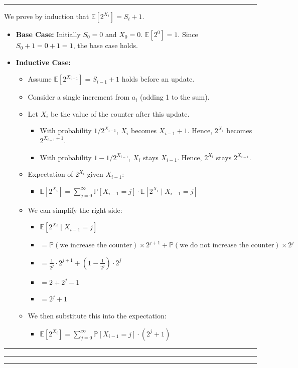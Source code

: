 \documentclass[11pt, english]{article}
\newenvironment{answer}{%
  \par\noindent\hrule %
  \vspace{0.25\baselineskip}%
  \noindent{\Large\bfseries Answer}\par\vspace{0.25\baselineskip}\noindent\ignorespaces
}{%
  \par\vspace{0.5\baselineskip}%
  \noindent\hrule\vspace{0.5\baselineskip}%
  \hrule\hrule
}
\begin{document}
\begin{answer}
We prove by induction that $\mathbb{E}[2^{X_i}] = S_i + 1$.

\begin{itemize}
    \item \textbf{Base Case:} Initially $S_0=0$ and $X_0=0$. $\mathbb{E}[2^0] = 1$. Since $S_0+1 = 0+1=1$, the base case holds.
    \item \textbf{Inductive Case:} 
    \begin{itemize}
        \item Assume $\mathbb{E}[2^{X_{i-1}}] = S_{i-1} + 1$ holds before an update.
        \item Consider a single increment from $a_i$ (adding 1 to the sum). 
        \item Let $X_{i}$ be the value of the counter after this update.
        \begin{itemize}
            \item With probability $1/2^{X_{i-1}}$, $X_{i}$ becomes $X_{i-1}+1$. Hence, $2^{X_{i}}$ becomes $2^{X_{i-1}+1}$.
            \item With probability $1 - 1/2^{X_{i-1}}$, $X_{i}$ stays $X_{i-1}$. Hence, $2^{X_{i}}$ stays $2^{X_{i-1}}$.
        \end{itemize}
        \item Expectation of $2^{X_{i}}$ given $X_{i-1}$:
        \begin{itemize}
          \item $\mathbb{E}[2^{X_{i}}] = \sum_{j=0}^{\infty} \mathbb{P}[X_{i-1} = j] \cdot \mathbb{E}[2^{X_i} \mid X_{i-1} = j]$
        \end{itemize}
        \item We can simplify the right side:
        \begin{itemize}
          \item $\mathbb{E}[2^{X_i} \mid X_{i-1} = j]$
          \item $ = \mathbb{P}(\text{we increase the counter}) \times 2^{j+1} + \mathbb{P}(\text{we do not increase the counter}) \times 2^j$
          \item $ = \frac{1}{2^j} \cdot 2^{j+1} + \left(1 - \frac{1}{2^j}\right) \cdot 2^j$
          \item $ = 2 + 2^j - 1$
          \item $ = 2^j + 1$
        \end{itemize}
        \item We then substitute this into the expectation:
        \begin{itemize}
          \item $\mathbb{E}[2^{X_i}] = \sum_{j=0}^{\infty} \mathbb{P}[X_{i-1} = j] \cdot (2^j + 1)$

\end{itemize}
\end{itemize}
\end{itemize}
\end{answer}
\end{document}
